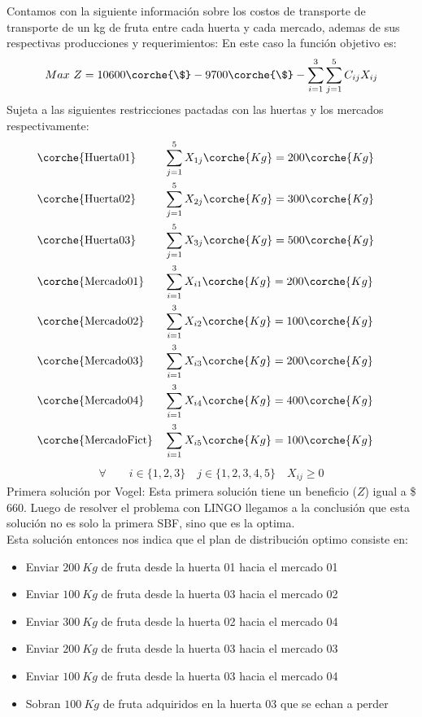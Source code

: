
\begin{homeworkProblem}
Contamos con la siguiente información sobre los costos de transporte de transporte de un kg de fruta entre cada huerta y cada mercado, ademas de sus respectivas producciones y requerimientos:
En este caso la función objetivo es:
\begin{align*}
    Max\ Z = 10600\corche{\$} - 9700\corche{\$} - \sum_{i=1}^{3}{\sum_{j=1}^{5}{C_{ij}X_{ij}}}
\end{align*}
Sujeta a las siguientes restricciones pactadas con las huertas y los mercados respectivamente:
\begin{align*}
    &\corche{\text{Huerta01}}& &\sum_{j=1}^{5}{X_{1j}}\corche{Kg} = 200\corche{Kg}&\\ 
    &\corche{\text{Huerta02}}& &\sum_{j=1}^{5}{X_{2j}}\corche{Kg} = 300\corche{Kg}&\\ 
    &\corche{\text{Huerta03}}& &\sum_{j=1}^{5}{X_{3j}}\corche{Kg} = 500\corche{Kg}&\\ 
    &\corche{\text{Mercado01}}& &\sum_{i=1}^{3}{X_{i1}}\corche{Kg} = 200\corche{Kg}&\\ 
    &\corche{\text{Mercado02}}& &\sum_{i=1}^{3}{X_{i2}}\corche{Kg} = 100\corche{Kg}&\\ 
    &\corche{\text{Mercado03}}& &\sum_{i=1}^{3}{X_{i3}}\corche{Kg} = 200\corche{Kg}&\\ 
    &\corche{\text{Mercado04}}& &\sum_{i=1}^{3}{X_{i4}}\corche{Kg} = 400\corche{Kg}&\\ 
    &\corche{\text{MercadoFict}}& &\sum_{i=1}^{3}{X_{i5}}\corche{Kg} = 100\corche{Kg}&\\ 
\end{align*}
\begin{align*}
     \forall\quad\quad i \in \{1,2,3\}\quad j \in \{1,2,3,4,5\}\quad X_{ij} \ge 0
\end{align*}
Primera solución por Vogel:
Esta primera solución tiene un beneficio ($Z$) igual a \$ 660. Luego de resolver el problema con LINGO llegamos a la conclusión que esta solución no es solo la primera SBF, sino que es la optima. \\
Esta solución entonces nos indica que el plan de distribución optimo consiste en:
\begin{itemize}
    \item Enviar $200\ Kg$ de fruta desde la huerta 01 hacia el mercado 01 
    \item Enviar $100\ Kg$ de fruta desde la huerta 03 hacia el mercado 02 
    \item Enviar $300\ Kg$ de fruta desde la huerta 02 hacia el mercado 04 
    \item Enviar $200\ Kg$ de fruta desde la huerta 03 hacia el mercado 03 
    \item Enviar $100\ Kg$ de fruta desde la huerta 03 hacia el mercado 04
    \item Sobran $100\ Kg$ de fruta adquiridos en la huerta 03 que se echan a perder 
\end{itemize}

\end{homeworkProblem}

 
